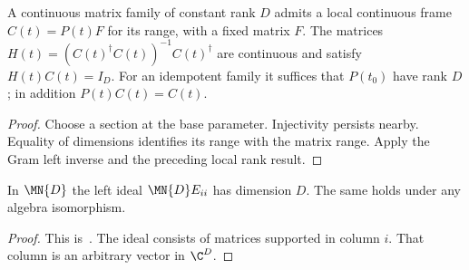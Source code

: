 \begin{lemma}
    \label{thm:spt_continuous_idempotent_frame}
    \leanok
    A continuous matrix family of constant rank $D$ admits a local
    continuous frame $C(t)=P(t)F$ for its range, with a fixed matrix $F$.
    The matrices $H(t)=(C(t)^\dagger C(t))^{-1}C(t)^\dagger$ are continuous
    and satisfy $H(t)C(t)=I_D$.
    For an idempotent family it suffices that $P(t_0)$ have rank $D$;
    in addition $P(t)C(t)=C(t)$.
\end{lemma}
\begin{proof}\leanok
    Choose a section at the base parameter. Injectivity persists nearby.
    Equality of dimensions identifies its range with the matrix range.
    Apply the Gram left inverse and the preceding local rank result.
\end{proof}

\begin{lemma}
    \label{thm:spt_primitive_left_ideal_dimension}
    \leanok
    In $\MN{D}$ the left ideal $\MN{D}E_{ii}$ has
    dimension $D$. The same holds under any algebra
    isomorphism.
\end{lemma}
\begin{proof}\leanok
    This is~\cite[``Dimension of a primitive left
        ideal'']{QICLean2026Blueprint}.
    The ideal consists of matrices supported in column $i$.
    That column is an arbitrary vector in $\C^D$.
\end{proof}

